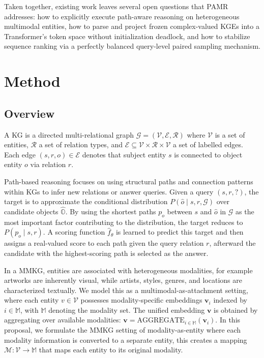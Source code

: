 \documentclass[runningheads]{llncs}
\begin{document}
Taken together, existing work leaves several open questions that PAMR addresses: how to explicitly execute path-aware reasoning on heterogeneous multimodal entities, how to parse and project frozen complex-valued KGEs into a Transformer's token space without initialization deadlock, and how to stabilize sequence ranking via a perfectly balanced query-level paired sampling mechanism.

\section{Method}
\label{sec:method}
\subsection{Overview}
\label{sec:overview}

A KG is a directed multi-relational graph
$\mathcal{G} = (\mathcal{V}, \mathcal{E}, \mathcal{R})$ where
$\mathcal{V}$ is a set of entities, $\mathcal{R}$ a set of relation types,
and $\mathcal{E} \subseteq \mathcal{V} \times \mathcal{R} \times \mathcal{V}$
a set of labelled edges. Each edge $(s, r, o) \in \mathcal{E}$
denotes that subject entity $s$ is connected to object entity $o$
via relation $r$.

Path-based reasoning focuses on using structural paths and connection
patterns within KGs to infer new relations or answer queries. Given
a query $(s, r, ?)$, the target is to approximate the conditional
distribution $P(\hat{o} \mid s, r, \mathcal{G})$ over candidate
objects $\hat{\mathbb{O}}$. By using the shortest paths $p_o$ between $s$ and $\hat{o}$ in $\mathcal{G}$ as the most important factor contributing to the distribution,
the target reduces to $P(p_o \mid s, r)$. A scoring function
$\hat{f}_\theta$ is learned to predict this target and then assigns a real-valued score to each path given the
query relation $r$, afterward the candidate with the highest-scoring path is selected as the answer.

In a MMKG, entities are associated with heterogeneous modalities, for example artworks are inherently visual, while artists,
styles, genres, and locations are characterized textually. We model
this as a multimodal-as-attachment setting, where each entity $v \in \mathcal{V}$
possesses modality-specific embeddings $\mathbf{v}_i$ indexed by
$i \in \mathbb{M}$, with $\mathbb{M}$ denoting the modality set.
The unified embedding $\mathbf{v}$ is obtained
by aggregating over available modalities: $\mathbf{v} =
\text{AGGREGATE}_{i \in \mathbb{M}} (\mathbf{v}_i)$. In this proposal, we formulate the MMKG setting of modality-as-entity where each modality information is converted to a separate entity, this creates a mapping $\mathcal{M}: \mathcal{V} \to \mathbb{M}$ that maps each entity to its original modality.
\end{document}
